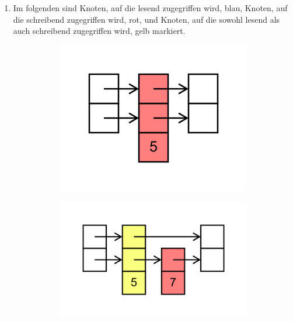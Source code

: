 \documentclass[11pt,a4paper]{article}
\begin{document}
\begin{loesung}
    \begin{enumerate}
        \item Im folgenden sind Knoten, auf die lesend zugegriffen wird, blau, Knoten, auf die schreibend zugegriffen wird, rot, und Knoten, auf die sowohl lesend als auch schreibend zugegriffen wird, gelb markiert.
        \begin{figure}[h!]
            \centering
            \begin{subfigure}[b]{0.3\textwidth}
                \centering
                \includegraphics[scale=0.15]{img/2a/1}
            \end{subfigure}
            \begin{subfigure}[b]{0.3\textwidth}
                \centering
                \includegraphics[scale=0.15]{img/2a/2}

\end{subfigure}
\end{figure}
\end{enumerate}
\end{loesung}
\end{document}

